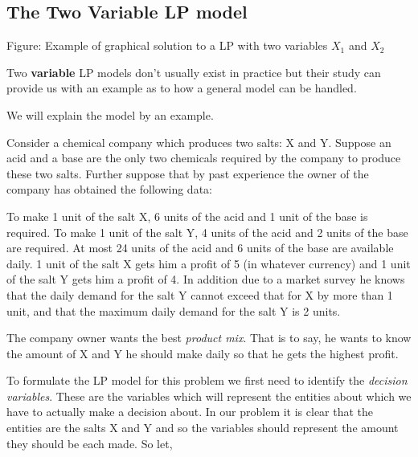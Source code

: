 \subsection{The Two Variable LP model}
\label{sss:thet-cba1}







Figure: Example of graphical solution to a LP with two variables $X _1$ and $X _2$



Two \textbf{variable} LP models don't usually exist in practice but their study can
provide us with an example as to how a general model can be handled.



We will explain the model by an example.



Consider a chemical company which produces two salts: X and Y. Suppose an acid and a base
are the only two chemicals required by the company to produce these two salts. Further
suppose that by past experience the owner of the company has obtained the following data:



To make 1 unit of the salt X, 6 units of the acid and 1 unit of the base is required. To
make 1 unit of the salt Y, 4 units of the acid and 2 units of the base are required. At
most 24 units of the acid and 6 units of the base are available daily. 1 unit of the salt
X gets him a profit of 5 (in whatever currency) and 1 unit of the salt Y gets him a profit
of 4. In addition due to a market survey he knows that the daily demand for the salt Y
cannot exceed that for X by more than 1 unit, and that the maximum daily demand for the
salt Y is 2 units.



The company owner wants the best \textit{product mix}. That is to say, he wants to know
the amount of X and Y he should make daily so that he gets the highest profit.



To formulate the LP model for this problem we first need to identify the \textit{decision
variables}. These are the variables which will represent the entities about which we have
to actually make a decision about. In our problem it is clear that the entities are the
salts X and Y and so the variables should represent the amount they should be each made.
So let,




